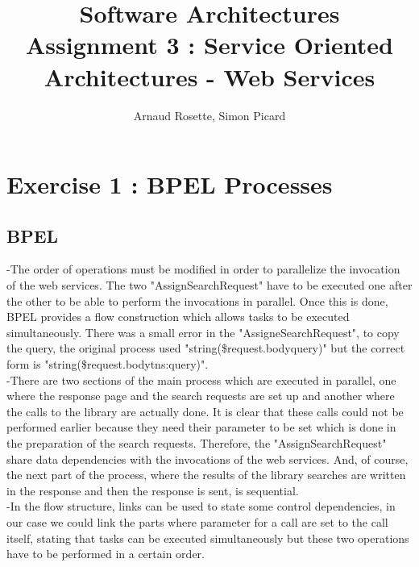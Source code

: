 \documentclass[a4paper,10pt]{article}
\title{Software Architectures\\ Assignment 3 : Service Oriented Architectures - Web Services}
\author{Arnaud Rosette, Simon Picard}
\begin{document}
\maketitle
\section{Exercise 1 : BPEL Processes}
\subsection{BPEL}
-The order of operations must be modified in order to parallelize the invocation of the web services. The two "AssignSearchRequest" have to be executed one  after the other to be able to perform the invocations in parallel. Once this is done, BPEL provides a flow construction which allows tasks to be executed simultaneously. There was a small error in the "AssigneSearchRequest", to copy the query, the original process used "string(\$request.body\/\/query)" but the correct form is "string(\$request.body\/\/tns:query)".\\

-There are two sections of the main process which are executed in parallel, one where the response page and the search requests are set up and another where the calls to the library are actually done. It is clear that these calls could not be performed earlier because they need their parameter to be set which is done in the preparation of the search requests. Therefore, the "AssignSearchRequest" share data dependencies with the invocations of the web services. And, of course, the next part of the process, where the results of the library searches are written in the response and then the response is sent, is sequential.\\

-In the flow structure, links can be used to state some control dependencies, in our case we could link the parts where parameter for a call are set to the call itself, stating that tasks can be executed simultaneously but these two operations have to be performed in a certain order.
\end{document}
